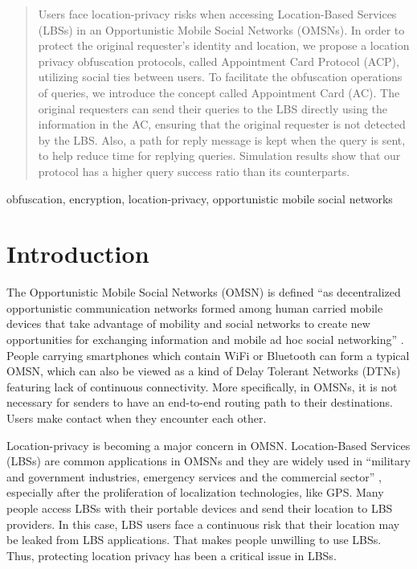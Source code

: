 \documentclass[conference]{IEEEtran}
\begin{document}
\begin{abstract}

Users face location-privacy risks when accessing Location-Based Services (LBSs) in an Opportunistic Mobile Social Networks (OMSNs). In order to protect the original requester's identity and location, we propose a location privacy obfuscation protocols, called Appointment Card Protocol (ACP), utilizing social ties between users. To facilitate the obfuscation operations of queries, we introduce the concept called Appointment Card (AC). The original requesters can send their queries to the LBS directly using the information in the AC, ensuring that the original requester is not detected by the LBS. Also, a path for reply message is kept when the query is sent, to help reduce time for replying queries. Simulation results show that our protocol has a higher query success ratio than its counterparts.

\end{abstract}

\begin{IEEEkeywords}
obfuscation, encryption, location-privacy, opportunistic mobile social networks
\end{IEEEkeywords}

\section{Introduction}

The Opportunistic Mobile Social Networks (OMSN) is defined ``as decentralized opportunistic communication networks formed among human carried mobile devices that take advantage of mobility and social networks to create new opportunities for exchanging information and mobile ad hoc social networking'' \cite {C24}. People carrying smartphones which contain WiFi or Bluetooth can form a typical OMSN, which can also be viewed as a kind of Delay Tolerant Networks (DTNs) \cite {C1} featuring lack of continuous connectivity. More specifically, in OMSNs, it is not necessary for senders to have an end-to-end routing path to their destinations. Users make contact when they encounter each other. 

Location-privacy is becoming a major concern in OMSN.  Location-Based Services (LBSs) are common applications in OMSNs and they are widely used in ``military and government industries, emergency services and the commercial sector'' \cite {C2}, especially after the proliferation of localization technologies, like GPS. Many people access LBSs with their portable devices and send their location to LBS providers. In this case, LBS users face a continuous risk that their location may be leaked from LBS applications. That makes people unwilling to use LBSs. Thus, protecting location privacy has been a critical issue in LBSs.
\end{document}
